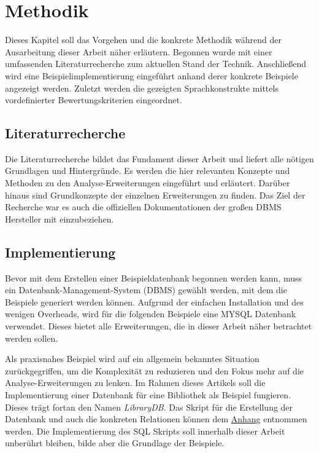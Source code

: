 \chapter{Methodik}
\label{chap:methodik} Dieses Kapitel soll das Vorgehen und die konkrete Methodik
während der Ausarbeitung dieser Arbeit näher erläutern. Begonnen wurde mit einer
umfassenden Literaturrecherche zum aktuellen Stand der Technik. Anschließend wird
eine Beispielimplementierung eingeführt anhand derer konkrete Beispiele angezeigt
werden. Zuletzt werden die gezeigten Sprachkonstrukte mittels vordefinierter
Bewertungskriterien eingeordnet.

\section{Literaturrecherche}
\label{sec:literaturrecherche} Die Literaturrecherche bildet das Fundament
dieser Arbeit und liefert alle nötigen Grundlagen und Hintergründe. Es werden die
hier relevanten Konzepte und Methoden zu den Analyse-Erweiterungen eingeführt und
erläutert. Darüber hinaus sind Grundkonzepte der einzelnen Erweiterungen zu
finden. Das Ziel der Recherche war es auch die offiziellen Dokumentationen der großen
DBMS Hersteller mit einzubeziehen.

\section{Implementierung}
\label{sec:implementierung} Bevor mit dem Erstellen einer Beispieldatenbank begonnen
werden kann, muss ein Datenbank-Management-System (DBMS) gewählt werden, mit dem
die Beispiele generiert werden können. Aufgrund der einfachen Installation und
des wenigen Overheads, wird für die folgenden Beispiele eine MYSQL Datenbank verwendet.
Dieses bietet alle Erweiterungen, die in dieser Arbeit näher betrachtet werden sollen.

Als praxisnahes Beispiel wird auf ein allgemein bekanntes Situation zurückgegriffen,
um die Komplexität zu reduzieren und den Fokus mehr auf die Analyse-Erweiterungen
zu lenken. Im Rahmen dieses Artikels soll die Implementierung einer Datenbank für
eine Bibliothek als Beispiel fungieren. Dieses trägt fortan den Namen \textit{LibraryDB}.
Das Skript für die Erstellung der Datenbank und auch die konkreten Relationen
können dem \hyperref[sec:library_db]{Anhang} entnommen werden. Die Implementierung
des SQL Skripts soll innerhalb dieser Arbeit unberührt bleiben, bilde aber die
Grundlage der Beispiele.

